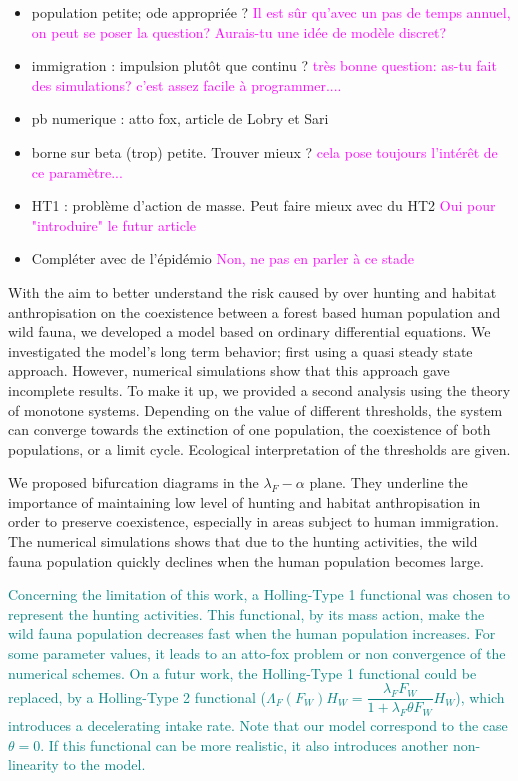 \documentclass{article}
\newcommand{\lfw}{\lambda_{F}}
\newcommand{\lfw}{\lambda_{F}}
\newcommand{\YD}[1]{\textcolor{magenta}{#1}}
\newcommand{\vtrois}[1]{\textcolor{OliveGreen}{#1}}
\newcommand{\vquatre}[1]{\textcolor{teal}{#1}}
\theoremstyle{definition}
\theoremstyle{remark}
\begin{document}
\begin{itemize}
\item population petite; ode appropriée ? \YD{Il est sûr qu'avec un pas de temps annuel, on peut se poser la question? Aurais-tu une idée de modèle discret?}
\item immigration : impulsion plutôt que continu ? \YD{très bonne question: as-tu fait des simulations? c'est assez facile à programmer....}
\item pb numerique : atto fox, article de Lobry et Sari
\item borne sur beta (trop) petite. Trouver mieux ? \YD{cela pose toujours l'intérêt de ce paramètre...}
\item HT1 : problème d'action de masse. Peut faire mieux avec du HT2 \YD{Oui pour "introduire" le futur article}
\item Compléter avec de l'épidémio \YD{Non, ne pas en parler à ce stade}
\end{itemize}

\vtrois{
With the aim to better understand the risk caused by over hunting and habitat anthropisation on the coexistence between a forest based human population and wild fauna, we developed a model based on ordinary differential equations. We investigated the model's long term behavior;  first using a quasi steady state approach. However, numerical simulations show that this approach gave incomplete results. To make it up, we provided a second analysis using the theory of monotone systems. Depending on the value of different thresholds, the system can converge towards the extinction of one population, the coexistence of both populations, or a limit cycle. Ecological interpretation of the thresholds are given.
}

\vtrois{
We proposed bifurcation diagrams in the $\lfw-\alpha$ plane. They underline the importance of maintaining low level of hunting and habitat anthropisation in order to preserve coexistence, especially in areas subject to human immigration. The numerical simulations shows that due to the hunting activities, the wild fauna population quickly declines when the human population becomes large. 
}

\vquatre{
Concerning the limitation of this work, a Holling-Type 1 functional was chosen to represent the hunting activities. This functional, by its mass action, make the wild fauna population decreases fast when the human population increases. For some parameter values, it leads to an atto-fox problem or non convergence of the numerical schemes. On a futur work, the Holling-Type 1 functional could be replaced, by a Holling-Type 2 functional ($\Lambda_F(F_W)H_W = \dfrac{\lfw F_W}{1+ \lfw \theta F_W}H_W$), which introduces a decelerating intake rate. Note that our model correspond to the case $\theta = 0$. If this functional can be more realistic, it also introduces another non-linearity to the model.
}
\end{document}
